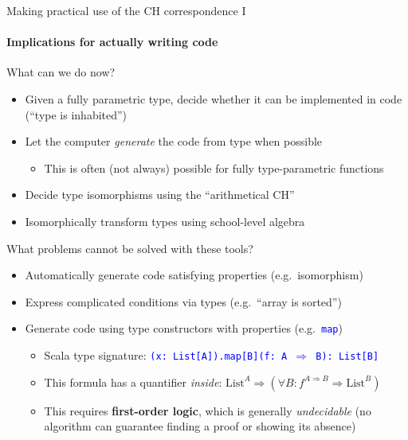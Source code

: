 \documentclass[english]{beamer}
\begin{document}
\begin{frame}{Making practical use of the CH correspondence I}


\framesubtitle{Implications for actually writing code}

What can we do now?
\begin{itemize}
\item Given a fully parametric type, decide whether it can be implemented
in code (``type is inhabited'')
\item Let the computer \emph{generate} the code from type when possible
\begin{itemize}
\item This is often (not always) possible for fully type-parametric functions
\end{itemize}
\item Decide type isomorphisms using the ``arithmetical CH''
\item Isomorphically transform types using school-level algebra
\end{itemize}
What problems cannot be solved with these tools?
\begin{itemize}
\item Automatically generate code satisfying properties (e.g.\ isomorphism) 
\item Express complicated conditions via types (e.g.\ ``array is sorted'') 
\item Generate code using type constructors with properties (e.g.\ \texttt{\textcolor{blue}{\footnotesize{}map}})
\begin{itemize}
\item Scala type signature: \texttt{\textcolor{blue}{\footnotesize{}(x:\ List{[}A{]}).map{[}B{]}(f:\ A
$\Rightarrow$ B):\ List{[}B{]}}}{\footnotesize \par}
\item This formula has a quantifier \emph{inside}: $\text{List}^{A}\Rightarrow(\forall B:f^{A\Rightarrow B}\Rightarrow\text{List}^{B})$
\item This requires \textbf{first-order logic}, which is generally \emph{undecidable}
(no algorithm can guarantee finding a proof or showing its absence)
\end{itemize}
\end{itemize}
\end{frame}
\end{document}

